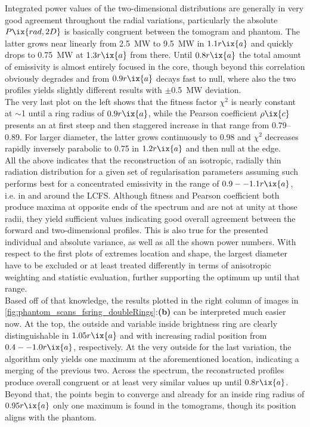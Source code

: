                 Integrated power values of the two-dimensional distributions are generally in very good agreement throughout the radial variations, particularly the absolute $P\ix{rad,2D}$ is basically congruent between the tomogram and phantom. The latter grows near linearly from \SI{2.5}{\mega\watt} to \SI{9.5}{\mega\watt} in $1.1r\ix{a}$ and quickly drops to \SI{0.75}{\mega\watt} at $1.3r\ix{a}$ from there. Until $0.8r\ix{a}$ the total amount of emissivity is almost entirely focused in the core, though beyond this correlation obviously degrades and from $0.9r\ix{a}$ decays fast to null, where also the two profiles yields slightly different results with $\pm$\SI{0.5}{\mega\watt} deviation.\\%
                The very last plot on the left shows that the fitness factor $\chi^{2}$ is nearly constant at $\sim$\SI{1}{\arbitraryunit} until a ring radius of $0.9r\ix{a}$, while the Pearson coefficient $\rho\ix{c}$ presents an at first steep and then staggered increase in that range from \SIrange{0.79}{0.89}{\arbitraryunit}. For larger diameter, the latter grows continuously to \SI{0.98}{\arbitraryunit} and $\chi^{2}$ decreases rapidly inversely parabolic to \SI{0.75}{\arbitraryunit} in $1.2r\ix{a}$ and then null at the edge.\\%
                All the above indicates that the reconstruction of an isotropic, radially thin radiation distribution for a given set of regularisation parameters assuming such performs best for a concentrated emissivity in the range of $0.9--1.1r\ix{a}$, i.e. in and around the LCFS. Although fitness and Pearson coefficient both produce maxima at opposite ends of the spectrum and are not at unity at those radii, they yield sufficient values indicating good overall agreement between the forward and two-dimensional profiles. This is also true for the presented individual and absolute variance, as well as all the shown power numbers. With respect to the first plots of extremes location and shape, the largest diameter have to be excluded or at least treated differently in terms of anisotropic weighting and statistic evaluation, further supporting the optimum up until that range.\\%
                Based off of that knowledge, the results plotted in the right column of images in \cref{fig:phantom_scans_fsring_doubleRings}:\textbf{(b)} can be interpreted much easier now. At the top, the outside and variable inside brightness ring are clearly distinguishable in $1.05r\ix{a}$ and with increasing radial position from $0.4--1.0r\ix{a}$, respectively. At the very outside for the last variation, the algorithm only yields one maximum at the aforementioned location, indicating a merging of the previous two. Across the spectrum, the reconstructed profiles produce overall congruent or at least very similar values up until $0.8r\ix{a}$. Beyond that, the points begin to converge and already for an inside ring radius of $0.95r\ix{a}$ only one maximum is found in the tomograms, though its position aligns with the phantom.\\%
